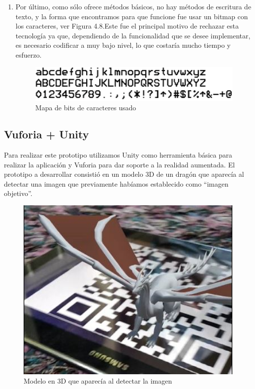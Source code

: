 \begin{enumerate}
\begin{figure}
    \end{figure}
    \item Por último, como sólo ofrece métodos básicos, no hay métodos de escritura de texto, y la forma que 
    encontramos para que funcione fue usar un bitmap con los caracteres, ver Figura 4.8.Este fue el principal 
    motivo de rechazar esta tecnología ya que, dependiendo de la funcionalidad que se desee implementar, es necesario codificar a muy bajo nivel, lo que costaría mucho tiempo y esfuerzo.
    \begin{figure}
        \centering
        \includegraphics[width=5in]{figures/bitmap-font.png}
        \caption{Mapa de bits de caracteres usado}
    \end{figure}
\end{enumerate}

\subsection{Vuforia + Unity} 
\label{makereference4.1.4}

    Para realizar este prototipo utilizamos Unity como herramienta básica para realizar la aplicación y Vuforia para dar soporte a la realidad aumentada.
    El prototipo a desarrollar consistió en un modelo 3D de un dragón que aparecía al detectar una imagen que previamente habíamos establecido como ``imagen objetivo''.

    \begin{figure}[H]
        \centering
        \includegraphics[width=5in]{figures/prototipoUnity.jpg}
        \caption{Modelo en 3D que aparecía al detectar la imagen}
    \end{figure}

